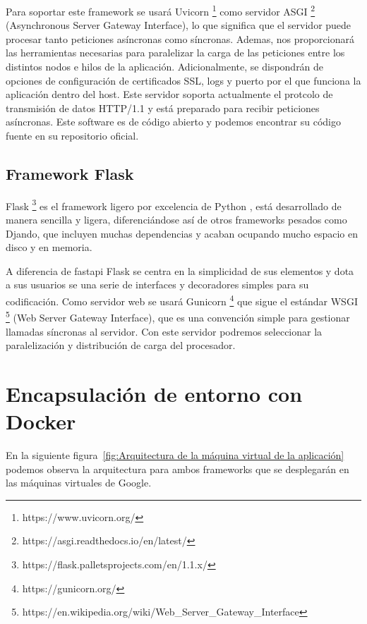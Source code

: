 Para soportar este framework se usará Uvicorn \footnote{https://www.uvicorn.org/} como servidor ASGI \footnote{https://asgi.readthedocs.io/en/latest/} (Asynchronous Server Gateway Interface), lo que significa que el servidor puede procesar tanto peticiones asíncronas como síncronas.
Ademas, nos proporcionará las herramientas necesarias para paralelizar la carga de las peticiones entre los distintos nodos e hilos de la aplicación.
Adicionalmente, se dispondrán de opciones de configuración de certificados SSL, logs y puerto por el que funciona la aplicación dentro del host.
Este servidor soporta actualmente el protcolo de transmisión de datos HTTP/1.1 y está preparado para recibir peticiones asíncronas.
Este software es de código abierto y podemos encontrar su código fuente en su repositorio oficial.

\subsection{Framework Flask}\label{subsec:framework-flask}
Flask \footnote{https://flask.palletsprojects.com/en/1.1.x/} es el framework ligero por excelencia de Python , está desarrollado de manera sencilla y ligera, diferenciándose así de otros frameworks pesados como Djando, que incluyen
muchas dependencias y acaban ocupando mucho espacio en disco y en memoria.

A diferencia de fastapi Flask se centra en la simplicidad de sus elementos y dota a sus usuarios se una serie de interfaces y decoradores simples para su codificación.
Como servidor web se usará Gunicorn \footnote{https://gunicorn.org/} que sigue el estándar WSGI \footnote{https://en.wikipedia.org/wiki/Web\_Server\_Gateway\_Interface} (Web Server Gateway Interface), que es una convención simple para gestionar llamadas síncronas al servidor.
Con este servidor podremos seleccionar la paralelización y distribución de carga del procesador.
\section{Encapsulación de entorno con Docker}\label{sec:encapsulación-de-entorno-con-docker}
En la siguiente figura~\ref{fig:Arquitectura de la máquina virtual de la aplicación} podemos observa la arquitectura para ambos frameworks que se desplegarán en las máquinas virtuales de Google.

